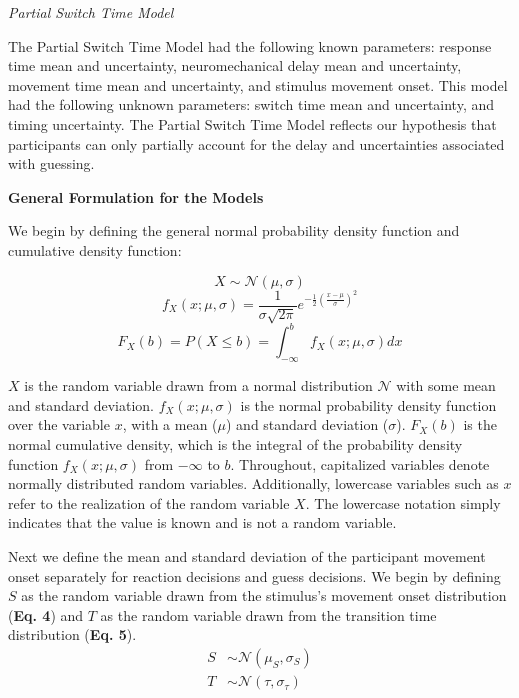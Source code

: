 \documentclass[12pt]{article}
\newcommand\boldblue[1]{\textcolor{mydarkblue}{\textbf{#1}}}
\begin{document}
\vspace{2mm}
\noindent \emph{Partial Switch Time Model}

\noindent The Partial Switch Time Model had the following known parameters: response time mean and uncertainty, neuromechanical delay mean and uncertainty, movement time mean and uncertainty, and stimulus movement onset. This model had the following unknown parameters: switch time mean and uncertainty, and timing uncertainty. The Partial Switch Time Model reflects our hypothesis that participants can only partially account for the delay and uncertainties associated with guessing.

\vspace{2mm}
\noindent \boldblue{General Formulation for the Models}

\noindent We begin by defining the general normal probability density function and cumulative density function:
\setlength{\belowdisplayskip}{4pt} \setlength{\belowdisplayshortskip}{4pt} %
\setlength{\abovedisplayskip}{4pt} \setlength{\abovedisplayshortskip}{4pt}

\setcounter{equation}{0}

\begin{equation}
    X\sim\mathcal{N}(\mu,\sigma)
\end{equation}
\begin{equation}
    f_{X}(x; \mu, \sigma) = \frac{1}{\sigma\sqrt{2\pi}}e^{-\frac{1}{2}(\frac{x-\mu}{\sigma})^2}
\end{equation}
\begin{equation}
    F_{X}(b) = P(X \leq b) = \int_{-\infty}^{b} f_{X}(x; \mu, \sigma)dx
\end{equation}

$X$ is the random variable drawn from a normal distribution $\mathcal{N}$ with some mean and standard deviation. $f_{X}(x;\mu,\sigma)$ is the normal probability density function over the variable $x$, with a mean ($\mu$) and standard deviation ($\sigma$). $F_{X}(b)$ is the normal cumulative density, which is the integral of the probability density function $f_{X}(x;\mu,\sigma)$ from $-\infty$ to $b$. Throughout, capitalized variables denote normally distributed random variables. Additionally, lowercase variables such as $x$ refer to the realization of the random variable $X$. The lowercase notation simply indicates that the value is known and is not a random variable.

Next we define the mean and standard deviation of the participant movement onset separately for reaction decisions and guess decisions. We begin by defining $S$ as the random variable drawn from the stimulus’s movement onset distribution (\boldblue{Eq. 4}) and $T$ as the random variable drawn from the transition time distribution (\boldblue{Eq. 5}).
\begin{align}
    S & \sim\mathcal{N}(\mu_{S},\sigma_{S}) \\
    T & \sim\mathcal{N}(\tau,\sigma_{\tau})
\end{align}
\end{document}
